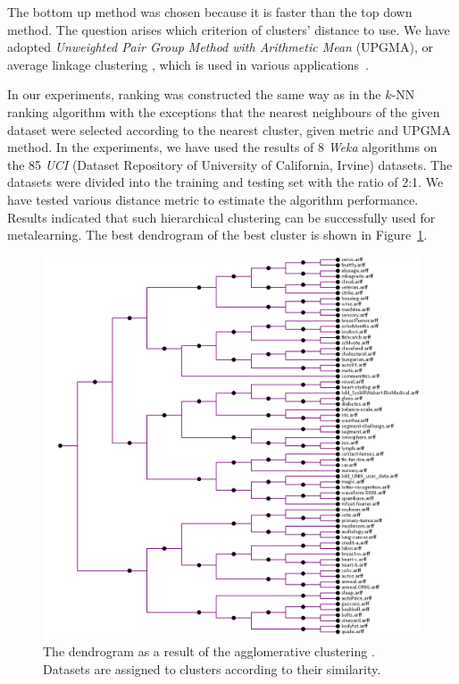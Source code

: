The bottom up method was chosen because it is faster than the top down method. The question arises which criterion of clusters’ distance to use. We have adopted \emph{Unweighted Pair Group Method with Arithmetic Mean} (UPGMA), or average linkage clustering \cite{hierarchicalClustering}, which is used in various applications~\cite{hierarchicalClusteringApplications}.

In our experiments, ranking was constructed the same way as in the $k$-NN ranking algorithm with the exceptions that the nearest neighbours of the given dataset were selected according to the nearest cluster, given metric and UPGMA method. In the experiments, we have used the results of 8 \emph{Weka} \cite{weka} algorithms on the 85 \emph{UCI} (Dataset Repository of University of California, Irvine) \cite{uci} datasets. The datasets were divided into the training and testing set with the ratio of 2:1. We have tested various distance metric to estimate the algorithm performance. Results indicated that such hierarchical clustering can be successfully used for metalearning. The best dendrogram of the best cluster is shown in Figure~\ref{fig:dendrogram}. 

\begin{figure}
	\includegraphics[width=14cm]{Images/tree.png}
	\centering
		\caption{The dendrogram as a result of the agglomerative clustering \cite{jaICMLA2013}. Datasets are assigned to clusters according to their similarity.}
		\label{fig:dendrogram}	
\end{figure} 
 
